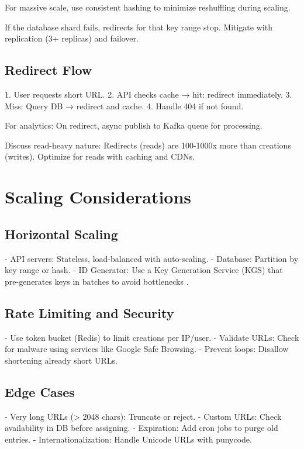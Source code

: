 For massive scale, use consistent hashing to minimize reshuffling during scaling.

\begin{failuremode}
If the database shard fails, redirects for that key range stop. Mitigate with replication (3+ replicas) and failover.
\end{failuremode}

\subsection{Redirect Flow}
1. User requests short URL.
2. API checks cache → hit: redirect immediately.
3. Miss: Query DB → redirect and cache.
4. Handle 404 if not found.

For analytics: On redirect, async publish to Kafka queue for processing.

\begin{interviewtip}
Discuss read-heavy nature: Redirects (reads) are 100-1000x more than creations (writes). Optimize for reads with caching and CDNs.
\end{interviewtip}

\section{Scaling Considerations}

\subsection{Horizontal Scaling}
- API servers: Stateless, load-balanced with auto-scaling.
- Database: Partition by key range or hash.
- ID Generator: Use a Key Generation Service (KGS) that pre-generates keys in batches to avoid bottlenecks \cite{reddit2021}.

\subsection{Rate Limiting and Security}
- Use token bucket (Redis) to limit creations per IP/user.
- Validate URLs: Check for malware using services like Google Safe Browsing.
- Prevent loops: Disallow shortening already short URLs.

\subsection{Edge Cases}
- Very long URLs (> 2048 chars): Truncate or reject.
- Custom URLs: Check availability in DB before assigning.
- Expiration: Add cron jobs to purge old entries.
- Internationalization: Handle Unicode URLs with punycode.

